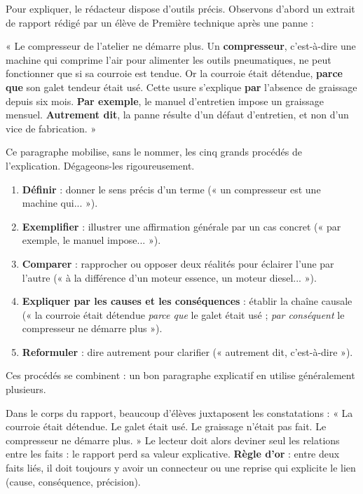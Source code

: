 \documentclass[11pt]{article}
\newcounter{popsec}
\newcounter{popsub}
\newcommand{\courssub}[1]{%
  \stepcounter{popsub}%
  \par\vspace{9pt}\noindent{\popxbold\fontsize{11.5}{13}\selectfont\color{popink}{\color{poporange}\thepopsec.\thepopsub}\hspace{6pt}#1}\par\nopagebreak\vspace{4pt}
}
\begin{document}
\courssub{Les procédés de l'explication}

Pour expliquer, le rédacteur dispose d'outils précis. Observons d'abord un extrait de rapport rédigé par un élève de Première technique après une panne :

\begin{exemplebox}
« Le compresseur de l'atelier ne démarre plus. Un \textbf{compresseur}, c'est-à-dire une machine qui comprime l'air pour alimenter les outils pneumatiques, ne peut fonctionner que si sa courroie est tendue. Or la courroie était détendue, \textbf{parce que} son galet tendeur était usé. Cette usure s'explique \textbf{par} l'absence de graissage depuis six mois. \textbf{Par exemple}, le manuel d'entretien impose un graissage mensuel. \textbf{Autrement dit}, la panne résulte d'un défaut d'entretien, et non d'un vice de fabrication. »
\end{exemplebox}

Ce paragraphe mobilise, sans le nommer, les cinq grands procédés de l'explication. Dégageons-les rigoureusement.

\begin{propriete}
\begin{enumerate}
\item \textbf{Définir} : donner le sens précis d'un terme (« un compresseur est une machine qui... »).
\item \textbf{Exemplifier} : illustrer une affirmation générale par un cas concret (« par exemple, le manuel impose... »).
\item \textbf{Comparer} : rapprocher ou opposer deux réalités pour éclairer l'une par l'autre (« à la différence d'un moteur essence, un moteur diesel... »).
\item \textbf{Expliquer par les causes et les conséquences} : établir la chaîne causale (« la courroie était détendue \emph{parce que} le galet était usé ; \emph{par conséquent} le compresseur ne démarre plus »).
\item \textbf{Reformuler} : dire autrement pour clarifier (« autrement dit, c'est-à-dire »).
\end{enumerate}
Ces procédés se combinent : un bon paragraphe explicatif en utilise généralement plusieurs.
\end{propriete}

\begin{attention}
Dans le corps du rapport, beaucoup d'élèves juxtaposent les constatations : « La courroie était détendue. Le galet était usé. Le graissage n'était pas fait. Le compresseur ne démarre plus. » Le lecteur doit alors deviner seul les relations entre les faits : le rapport perd sa valeur explicative. \textbf{Règle d'or} : entre deux faits liés, il doit toujours y avoir un connecteur ou une reprise qui explicite le lien (cause, conséquence, précision).
\end{attention}
\end{document}
